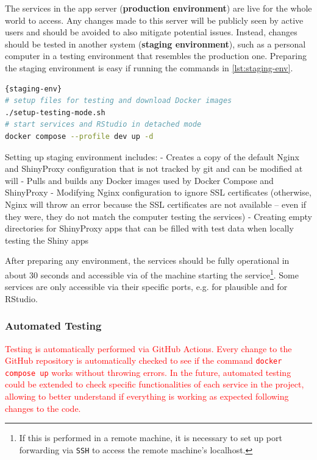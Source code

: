 The services in the app server (\textbf{production environment}) are live for the whole world to access. Any changes made to this server will be publicly seen by active users and should be avoided to also mitigate potential issues. Instead, changes should be tested in another system (\textbf{staging environment}), such as a personal computer in a testing environment that resembles the production one. Preparing the staging environment is easy if running the commands in \autoref{lst:staging-env}.

\begin{lstlisting}[caption=Setup testing environment.,language=bash,label={lst:staging-env}]{staging-env}
# setup files for testing and download Docker images
./setup-testing-mode.sh
# start services and RStudio in detached mode
docker compose --profile dev up -d
\end{lstlisting}

Setting up staging environment includes:
- Creates a copy of the default Nginx and ShinyProxy configuration that is not tracked by git and can be modified at will
- Pulls and builds any Docker images used by Docker Compose and ShinyProxy
- Modifying Nginx configuration to ignore SSL certificates (otherwise, Nginx will throw an error because the SSL certificates are not available -- even if they were, they do not match the computer testing the services)
- Creating empty directories for ShinyProxy apps that can be filled with test data when locally testing the Shiny apps

After preparing any environment, the services should be fully operational in about 30 seconds and accessible via  of the machine starting the service\footnote{If this is performed in a remote machine, it is necessary to set up port forwarding via \texttt{SSH} to access the remote machine's localhost.}. Some services are only accessible via their specific ports, e.g.  for plausible and  for RStudio.

\subsubsection{Automated Testing}

\textcolor{red}{Testing is automatically performed via GitHub Actions. Every change to the GitHub repository is automatically checked to see if the command \texttt{docker compose up} works without throwing errors. In the future, automated testing could be extended to check specific functionalities of each service in the project, allowing to better understand if everything is working as expected following changes to the code.}

